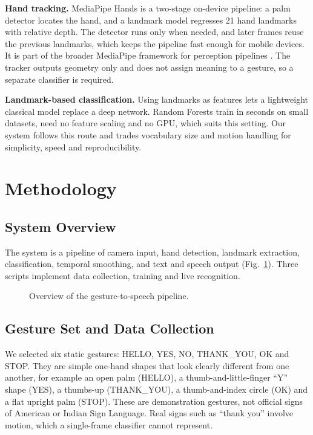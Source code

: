 \documentclass[conference]{IEEEtran}
\begin{document}
\textbf{Hand tracking.} MediaPipe Hands \cite{zhang2020} is a two-stage on-device pipeline: a palm detector locates the hand, and a landmark model regresses 21 hand landmarks with relative depth. The detector runs only when needed, and later frames reuse the previous landmarks, which keeps the pipeline fast enough for mobile devices. It is part of the broader MediaPipe framework for perception pipelines \cite{lugaresi2019}. The tracker outputs geometry only and does not assign meaning to a gesture, so a separate classifier is required.

\textbf{Landmark-based classification.} Using landmarks as features lets a lightweight classical model replace a deep network. Random Forests \cite{breiman2001} train in seconds on small datasets, need no feature scaling and no GPU, which suits this setting. Our system follows this route and trades vocabulary size and motion handling for simplicity, speed and reproducibility.

\section{Methodology}
\subsection{System Overview}
The system is a pipeline of camera input, hand detection, landmark extraction, classification, temporal smoothing, and text and speech output (Fig.~\ref{fig:pipeline}). Three scripts implement data collection, training and live recognition.

\begin{figure}[t]
\centering
{}
\caption{Overview of the gesture-to-speech pipeline.}
\label{fig:pipeline}
\end{figure}

\subsection{Gesture Set and Data Collection}
We selected six static gestures: HELLO, YES, NO, THANK\_YOU, OK and STOP. They are simple one-hand shapes that look clearly different from one another, for example an open palm (HELLO), a thumb-and-little-finger ``Y'' shape (YES), a thumbs-up (THANK\_YOU), a thumb-and-index circle (OK) and a flat upright palm (STOP). These are demonstration gestures, not official signs of American or Indian Sign Language. Real signs such as ``thank you'' involve motion, which a single-frame classifier cannot represent.
\end{document}
